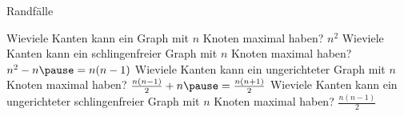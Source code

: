 \begin{frame}{Randfälle}
	\begin{itemize}
		\pitem Wieviele Kanten kann ein Graph mit $n$ Knoten maximal haben? \pause $n^2$
		\pitem Wieviele Kanten kann ein schlingenfreier Graph mit $n$ Knoten maximal haben? \pause $n^2-n \p = n(n-1)$
		\pitem Wieviele Kanten kann ein ungerichteter Graph mit $n$ Knoten maximal haben? \pause $\frac{n(n-1)}{2} + n\p = \frac{n(n+1)}{2}$
		\pitem Wieviele Kanten kann ein ungerichteter schlingenfreier Graph mit $n$ Knoten maximal haben? \pause $\frac{n(n-1)}{2}$
	\end{itemize}
\end{frame}

